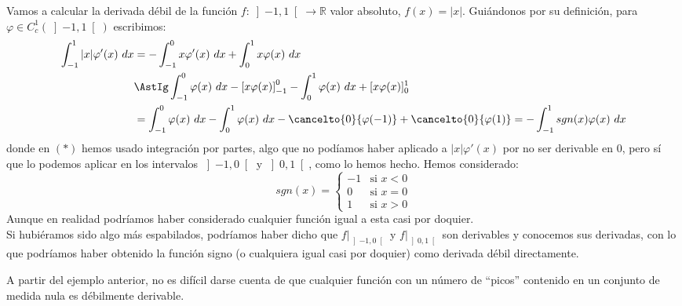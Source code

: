 \begin{ejemplo}
    Vamos a calcular la derivada débil de la función $f:\left]-1,1\right[\to \mathbb{R}$ valor absoluto, $f(x) = |x|$. Guiándonos por su definición, para $\varphi \in C_c^1(\left]-1,1\right[)$ escribimos:
    \begin{align*}
        \int_{-1}^{1} |x|\varphi'(x)~dx  &= -\int_{-1}^{0} x\varphi'(x)~dx + \int_{0}^{1} x\varphi(x)~dx  \\
                                         &\AstIg \int_{-1}^{0} \varphi(x)~dx - \left[x\varphi(x)\right]_{-1}^0 - \int_{0}^{1} \varphi(x)~dx + [x\varphi(x)]_0^1 \\
                                         &= \int_{-1}^{0} \varphi(x)~dx -\int_{0}^{1} \varphi(x)~dx  -\cancelto{0}{\varphi(-1)} + \cancelto{0}{\varphi(1)} = -\int_{-1}^{1} sgn(x)\varphi(x)~dx 
    \end{align*}
    donde en $(\ast)$ hemos usado integración por partes, algo que no podíamos haber aplicado a $|x|\varphi'(x)$ por no ser derivable en $0$, pero sí que lo podemos aplicar en los intervalos $\left]-1,0\right[$ y $\left]0,1\right[$, como lo hemos hecho. Hemos considerado:
    \begin{equation*}
        sgn(x) = \left\{\begin{array}{ll}
            -1 & \text{si\ } x<0 \\
            0 & \text{si\ } x=0 \\
            1 & \text{si\ } x>0
        \end{array}\right. 
    \end{equation*}
    Aunque en realidad podríamos haber considerado cualquier función igual a esta casi por doquier.\\

    \noindent
    Si hubiéramos sido algo más espabilados, podríamos haber dicho que $f\big|_{\left]-1,0\right[}$ y $f\big|_{\left]0,1\right[}$ son derivables y conocemos sus derivadas, con lo que podríamos haber obtenido la función signo (o cualquiera igual casi por doquier) como derivada débil directamente.
\end{ejemplo}

\noindent
A partir del ejemplo anterior, no es difícil darse cuenta de que cualquier función con un número de ``picos'' contenido en un conjunto de medida nula es débilmente derivable.

